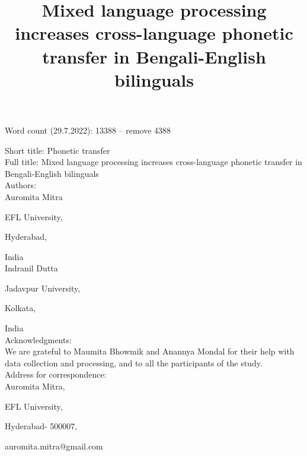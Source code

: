 \documentclass[12 pt]{article}
\title{Mixed language processing increases cross-language phonetic transfer in Bengali-English bilinguals}
\newlength\mystoreparindent
\newenvironment{myparindent}[1]{%
	\setlength{\mystoreparindent}{\the\parindent}
	\setlength{\parindent}{#1}
}{%
	\setlength{\parindent}{\mystoreparindent}
}
\begin{document}


Word count (29.7.2022): 13388 -- remove 4388 

\begin{singlespace}

\begin{myparindent}{0pt}
Short title: Phonetic transfer\\

Full title: Mixed language processing increases cross-language phonetic transfer in Bengali-English bilinguals\\

Authors:\\

Auromita Mitra

EFL University,

Hyderabad,

India\\

Indranil Dutta

Jadavpur University,

Kolkata,

India\\

Acknowledgments:\\
We are grateful to Maumita Bhowmik and Anannya Mondal for their help with data collection and processing, and to all the participants of the study.\\
 

Address for correspondence:\\
Auromita Mitra,

EFL University,

Hyderabad- 500007,

auromita.mitra@gmail.com

\end{myparindent}

\end{singlespace}
\end{document}
